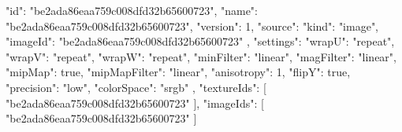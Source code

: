 {
  "id": "be2ada86eaa759c008dfd32b65600723",
  "name": "be2ada86eaa759c008dfd32b65600723",
  "version": 1,
  "source": {
    "kind": "image",
    "imageId": "be2ada86eaa759c008dfd32b65600723"
  },
  "settings": {
    "wrapU": "repeat",
    "wrapV": "repeat",
    "wrapW": "repeat",
    "minFilter": "linear",
    "magFilter": "linear",
    "mipMap": true,
    "mipMapFilter": "linear",
    "anisotropy": 1,
    "flipY": true,
    "precision": "low",
    "colorSpace": "srgb"
  },
  "textureIds": [
    "be2ada86eaa759c008dfd32b65600723"
  ],
  "imageIds": [
    "be2ada86eaa759c008dfd32b65600723"
  ]
}

